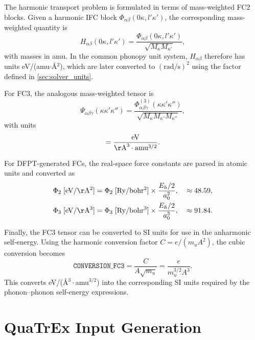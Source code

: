 The harmonic transport problem is formulated in terms of mass-weighted
FC2 blocks.  Given a harmonic IFC block
$\Phi_{\alpha\beta}(0\kappa,l'\kappa')$, the corresponding mass-weighted
quantity is
\begin{equation}
  H_{\alpha\beta}(0\kappa,l'\kappa')
  = \frac{\Phi_{\alpha\beta}(0\kappa,l'\kappa')}
         {\sqrt{M_\kappa M_{\kappa'}}},
\end{equation}
with masses in amu.  In the common phonopy unit system,
$H_{\alpha\beta}$ therefore has units
eV/(amu$\cdot$\AA$^2$), which are later converted to
$(\mathrm{rad/s})^2$ using the factor defined in
\cref{sec:solver_units}.

For FC3, the analogous mass-weighted tensor is
\begin{equation}\label{eq:fc3_mw}
  \Psi_{\alpha\beta\gamma}(\kappa\kappa'\kappa'')
  = \frac{\Phi^{(3)}_{\alpha\beta\gamma}(\kappa\kappa'\kappa'')}
         {\sqrt{M_\kappa M_{\kappa'} M_{\kappa''}}},
\end{equation}
with units
\begin{equation}
  [\Psi]
  = \frac{\mathrm{eV}}
         {\mathrm{\AA}^3\cdot\mathrm{amu}^{3/2}}.
\end{equation}

For DFPT-generated FCs, the real-space force constants are parsed in
atomic units and converted as
\begin{align}
  \Phi_2\;[\mathrm{eV/\AA^2}]
    &= \Phi_2\;[\mathrm{Ry/bohr^2}]
       \times \frac{E_h/2}{a_0^2},
    &&\approx 48.59, \\
  \Phi_3\;[\mathrm{eV/\AA^3}]
    &= \Phi_3\;[\mathrm{Ry/bohr^3}]
       \times \frac{E_h/2}{a_0^3},
    &&\approx 91.84.
\end{align}

Finally, the FC3 tensor can be converted to SI units for use in the
anharmonic self-energy.  Using the harmonic conversion factor
$C = e/(m_u A^2)$, the cubic conversion becomes
\begin{equation}\label{eq:conversion_fc3_ifc}
  \texttt{CONVERSION\_FC3}
  = \frac{C}{A\sqrt{m_u}}
  = \frac{e}{m_u^{3/2} A^3}.
\end{equation}
This converts
eV/(\AA$^3\cdot$amu$^{3/2}$) into the corresponding SI units required
by the phonon--phonon self-energy expressions.

\section{QuaTrEx Input Generation}
\label{sec:quatrex_harmonic_input}

